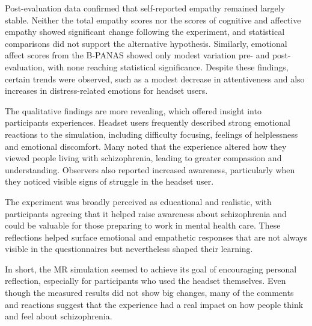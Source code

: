 \vspace{1em}

Post-evaluation data confirmed that self-reported empathy remained largely stable. Neither the total empathy scores nor the scores of cognitive and affective empathy showed significant change following the experiment, and statistical comparisons did not support the alternative hypothesis. Similarly, emotional affect scores from the B-PANAS showed only modest variation pre- and post-evaluation, with none reaching statistical significance. Despite these findings, certain trends were observed, such as a modest decrease in attentiveness and also increases in distress-related emotions for headset users.

\vspace{1em}

The qualitative findings are more revealing, which offered insight into participants experiences. Headset users frequently described strong emotional reactions to the simulation, including difficulty focusing, feelings of helplessness and emotional discomfort. Many noted that the experience altered how they viewed people living with schizophrenia, leading to greater compassion and understanding. Observers also reported increased awareness, particularly when they noticed visible signs of struggle in the headset user.

The experiment was broadly perceived as educational and realistic, with participants agreeing that it helped raise awareness about schizophrenia and could be valuable for those preparing to work in mental health care. These reflections helped surface emotional and empathetic responses that are not always visible in the questionnaires but nevertheless shaped their learning.

\vspace{1em}

In short, the MR simulation seemed to achieve its goal of encouraging personal reflection, especially for participants who used the headset themselves. Even though the measured results did not show big changes, many of the comments and reactions suggest that the experience had a real impact on how people think and feel about schizophrenia.